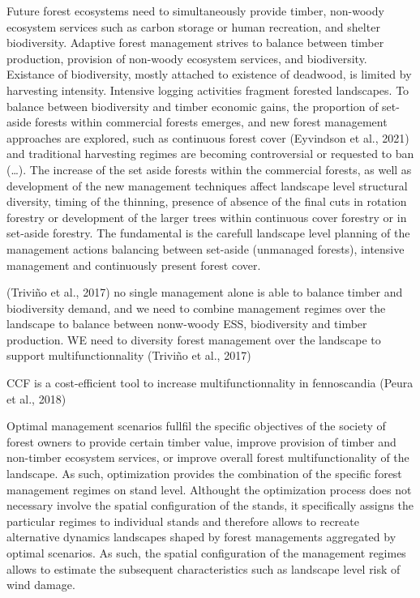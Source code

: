 \documentclass[]{elsarticle} %
\begin{document}
Future forest ecosystems need to simultaneously provide timber,
non-woody ecosystem services such as carbon storage or human recreation,
and shelter biodiversity. Adaptive forest management strives to balance
between timber production, provision of non-woody ecosystem services,
and biodiversity. Existance of biodiversity, mostly attached to
existence of deadwood, is limited by harvesting intensity. Intensive
logging activities fragment forested landscapes. To balance between
biodiversity and timber economic gains, the proportion of set-aside
forests within commercial forests emerges, and new forest management
approaches are explored, such as continuous forest cover (Eyvindson et
al., 2021) and traditional harvesting regimes are becoming controversial
or requested to ban (\ldots{}). The increase of the set aside forests
within the commercial forests, as well as development of the new
management techniques affect landscape level structural diversity,
timing of the thinning, presence of absence of the final cuts in
rotation forestry or development of the larger trees within continuous
cover forestry or in set-aside forestry. The fundamental is the carefull
landscape level planning of the management actions balancing between
set-aside (unmanaged forests), intensive management and continuously
present forest cover.

(Triviño et al., 2017) no single management alone is able to balance
timber and biodiversity demand, and we need to combine management
regimes over the landscape to balance between nonw-woody ESS,
biodiversity and timber production. WE need to diversity forest
management over the landscape to support multifunctionnality (Triviño et
al., 2017)

CCF is a cost-efficient tool to increase multifunctionnality in
fennoscandia (Peura et al., 2018)

Optimal management scenarios fullfil the specific objectives of the
society of forest owners to provide certain timber value, improve
provision of timber and non-timber ecosystem services, or improve
overall forest multifunctionality of the landscape. As such,
optimization provides the combination of the specific forest management
regimes on stand level. Althought the optimization process does not
necessary involve the spatial configuration of the stands, it
specifically assigns the particular regimes to individual stands and
therefore allows to recreate alternative dynamics landscapes shaped by
forest managements aggregated by optimal scenarios. As such, the spatial
configuration of the management regimes allows to estimate the
subsequent characteristics such as landscape level risk of wind damage.
\end{document}
